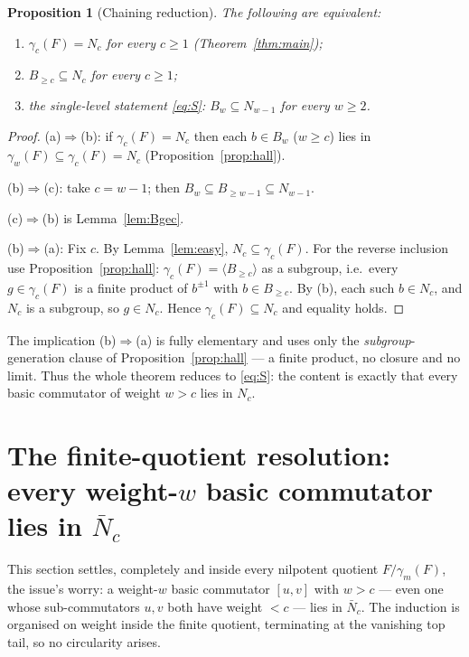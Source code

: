 \documentclass{amsart}
\newtheorem{proposition}{Proposition}
\theoremstyle{definition}
\theoremstyle{remark}
\begin{document}
\begin{proposition}[Chaining reduction]\label{prop:chain}
The following are equivalent:
\begin{enumerate}
\item[\textup{(a)}] $\gamma_c(F)=N_c$ for every $c\ge1$ \textup{(Theorem~\ref{thm:main})};
\item[\textup{(b)}] $B_{\ge c}\subseteq N_c$ for every $c\ge1$;
\item[\textup{(c)}] the single-level statement \eqref{eq:S}: $B_w\subseteq N_{w-1}$ for every $w\ge2$.
\end{enumerate}
\end{proposition}
\begin{proof}
(a)$\Rightarrow$(b): if $\gamma_c(F)=N_c$ then each $b\in B_w$ ($w\ge c$) lies in
$\gamma_w(F)\subseteq\gamma_c(F)=N_c$ (Proposition~\ref{prop:hall}).

(b)$\Rightarrow$(c): take $c=w-1$; then $B_w\subseteq B_{\ge w-1}\subseteq N_{w-1}$.

(c)$\Rightarrow$(b) is Lemma~\ref{lem:Bgec}.

(b)$\Rightarrow$(a): Fix $c$. By Lemma~\ref{lem:easy}, $N_c\subseteq\gamma_c(F)$. For
the reverse inclusion use Proposition~\ref{prop:hall}: $\gamma_c(F)=\langle B_{\ge
c}\rangle$ as a subgroup, i.e.\ every $g\in\gamma_c(F)$ is a finite product of
$b^{\pm1}$ with $b\in B_{\ge c}$. By (b), each such $b\in N_c$, and $N_c$ is a
subgroup, so $g\in N_c$. Hence $\gamma_c(F)\subseteq N_c$ and equality holds.
\end{proof}

\noindent The implication (b)$\Rightarrow$(a) is fully elementary and uses only the
\emph{subgroup}-generation clause of Proposition~\ref{prop:hall} --- a finite
product, no closure and no limit. Thus the whole theorem reduces to \eqref{eq:S}: the
content is exactly that every basic commutator of weight $w>c$ lies in $N_c$.

\section{The finite-quotient resolution: every weight-$w$ basic commutator lies in
$\bar N_c$}\label{sec:finite}

This section settles, completely and inside every nilpotent quotient $F/\gamma_m(F)$,
the issue's worry: a weight-$w$ basic commutator $[u,v]$ with $w>c$ --- even one whose
sub-commutators $u,v$ both have weight $<c$ --- lies in $\bar N_c$. The induction is
organised on weight inside the finite quotient, terminating at the vanishing top tail,
so no circularity arises.
\end{document}
